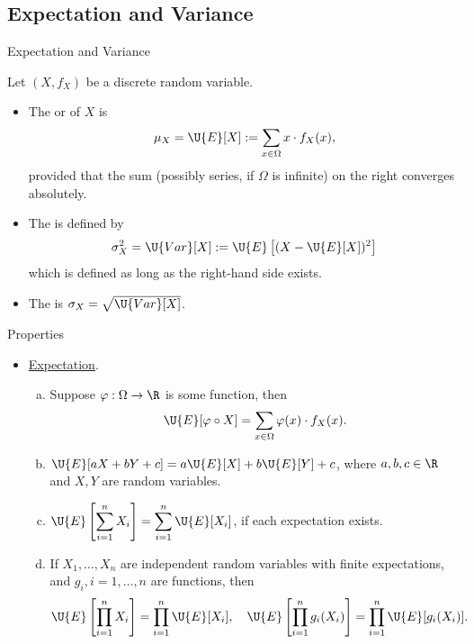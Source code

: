 \subsection{Expectation and Variance}

\begin{frame}{Expectation and Variance}

 Let $(X, f_X)$ be a discrete random variable.
\begin{itemize}
	\justifying
	\item The  or  of $X$ is 
	\begin{align*}
	\mu_X = \U{E}[X] := \sum_{x\in \Omega} x\cdot f_X(x),
	\end{align*}
	provided that the sum (possibly series, if $\Omega$ is infinite) on the right converges absolutely.
	\item The  is defined by
	\begin{align*}
	\sigma_X^2 = \U{Var}[X] := \U{E}\left[(X - \U{E}[X])^2 \right]
	\end{align*}
	which is defined as long as the right-hand side exists.
	\item The  is $\sigma_X = \sqrt{\U{Var}[X]}$.
\end{itemize}

\end{frame}

\begin{frame}{Properties}

\begin{itemize}
	\justifying
	\item \underline{Expectation}.
	\justifying
	\begin{enumerate}[(a).]
		\justifying
		\item Suppose $\varphi: \Omega \rightarrow \R$ is some function, then
		\begin{align*}
		\U{E}[\varphi\circ X] = \displaystyle \sum_{x\in \Omega} \varphi(x) \cdot f_X(x).
		\end{align*}
		\item $\U{E}[aX + bY + c] = a\U{E}[X] + b\U{E}[Y] + c$, where $a, b, c\in \R$ and $X, Y$ are random variables.
		\item $\displaystyle\U{E}\left[\sum_{i=1}^n X_i \right]  = \sum_{i=1}^n \U{E}[X_i]$, if each expectation exists.
		\item If $X_1, \ldots, X_n$ are independent random variables with finite expectations, and $g_i, i = 1, \ldots, n$ are functions, then 
		\begin{align*}
		\U{E}\left[\prod_{i=1}^n X_i \right] = \prod_{i=1}^n \U{E}[X_i], \quad \U{E}\left[\prod_{i=1}^n g_i(X_i) \right] = \prod_{i=1}^n \U{E}[g_i(X_i)].
		\end{align*}
	\end{enumerate}
\end{itemize}


\end{frame}

